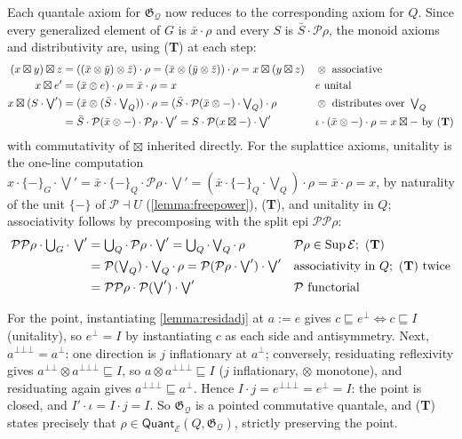 \documentclass{article}
\theoremstyle{definition}
\newcommand{\G}{\mathfrak{G}}
\newcommand{\cE}{\mathcal{E}}
\newcommand{\cP}{\mathcal{P}}
\newcommand{\cQ}{\mathcal{Q}}
\newcommand{\cat}[1]{\mathsf{#1}}
\newcommand{\Sup}{\operatorname{Sup}}
\begin{document}
{Each quantale axiom for $\G_\cQ$ now reduces to the corresponding axiom for $Q$. Since every generalized element of $G$ is $\bar x\cdot\rho$ and every $S$ is $\bar S\cdot\cP\rho$, the monoid axioms and distributivity are, using ({\bf T}) at each step:
\begin{align*}
(x\boxtimes y)\boxtimes z &= ((\bar x\otimes\bar y)\otimes\bar z)\cdot\rho = (\bar x\otimes(\bar y\otimes\bar z))\cdot\rho = x\boxtimes(y\boxtimes z) && \otimes\text{ associative}\\
x\boxtimes e' &= (\bar x\otimes e)\cdot\rho = \bar x\cdot\rho = x && e\text{ unital}\\
x\boxtimes(S\cdot\textstyle\bigvee') &= (\bar x\otimes(\bar S\cdot\textstyle\bigvee_Q))\cdot\rho = (\bar S\cdot\cP(\bar x\otimes-)\cdot\textstyle\bigvee_Q)\cdot\rho && \otimes\text{ distributes over }\textstyle\bigvee_Q\\
&= \bar S\cdot\cP(\bar x\otimes-)\cdot\cP\rho\cdot\textstyle\bigvee' = S\cdot\cP(x\boxtimes-)\cdot\textstyle\bigvee' && \iota\cdot(\bar x\otimes-)\cdot\rho = x\boxtimes-\ \text{by ({\bf T})}
\end{align*}
with commutativity of $\boxtimes$ inherited directly. For the suplattice axioms, unitality is the one-line computation $x\cdot\{-\}_G\cdot\bigvee' = \bar x\cdot\{-\}_Q\cdot\cP\rho\cdot\bigvee' = (\bar x\cdot\{-\}_Q\cdot\bigvee_Q)\cdot\rho = \bar x\cdot\rho = x$, by naturality of the unit $\{-\}$ of $\cP\dashv U$ (\cref{lemma:freepower}), ({\bf T}), and unitality in $Q$; associativity follows by precomposing with the split epi $\cP\cP\rho$:
\begin{align*}
\cP\cP\rho\cdot\textstyle\bigcup_G\cdot\,\textstyle\bigvee' &= \textstyle\bigcup_Q\cdot\,\cP\rho\cdot\textstyle\bigvee' = \textstyle\bigcup_Q\cdot\textstyle\bigvee_Q\cdot\,\rho && \cP\rho\in\Sup\cE;\ \text{({\bf T})}\\
&= \cP(\textstyle\bigvee_Q)\cdot\textstyle\bigvee_Q\cdot\,\rho = \cP(\cP\rho\cdot\textstyle\bigvee')\cdot\textstyle\bigvee' && \text{associativity in } Q;\ \text{({\bf T}) twice}\\
&= \cP\cP\rho\cdot\cP(\textstyle\bigvee')\cdot\textstyle\bigvee' && \cP\text{ functorial}
\end{align*}

For the point, instantiating \cref{lemma:residadj} at $a:=e$ gives $c\sqsubseteq e^\bot\iff c\sqsubseteq I$ (unitality), so $e^\bot=I$ by instantiating $c$ as each side and antisymmetry. 
Next, $a^{\bot\bot\bot}=a^\bot$: one direction is $j$ inflationary at $a^\bot$; conversely, residuating reflexivity gives $a^{\bot\bot}\otimes a^{\bot\bot\bot}\sqsubseteq I$, so $a\otimes a^{\bot\bot\bot}\sqsubseteq I$ ($j$ inflationary, $\otimes$ monotone), and residuating again gives $a^{\bot\bot\bot}\sqsubseteq a^\bot$. 
Hence $I\cdot j = e^{\bot\bot\bot} = e^\bot = I$: the point is closed, and $I'\cdot\iota = I\cdot j = I$. 
So $\G_\cQ$ is a pointed commutative quantale, and ({\bf T}) states precisely that $\rho\in\cat{Quant}_\cE(Q,\G_\cQ)$, strictly preserving the point.

}
\end{document}

